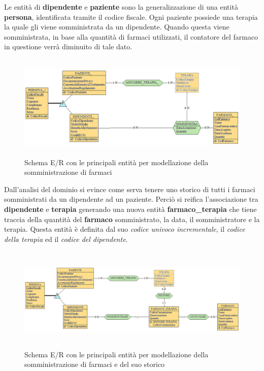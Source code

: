 \documentclass[a4paper, 12pt]{report}
\begin{document}
\noindent
Le entità di \textbf{dipendente} e \textbf{paziente} sono la generalizzazione di una entità \textbf{persona}, identificata
tramite il codice fiscale. Ogni paziente possiede una terapia la quale gli viene somministrata da un dipendente.
Quando questa viene somministrata, in base alla quantità di farmaci utilizzati, il contatore del farmaco in questione verrà
diminuito di tale dato.

\begin{figure}[H]
        \centering
        \includegraphics[height=5cm]{img/dipendentePazienteERPostReif.png}
        \caption{Schema E/R con le principali entità per modellazione della somministrazione di farmaci}
\end{figure}

\noindent
Dall'analisi del dominio si evince come serva tenere uno storico di tutti i farmaci somministrati
da un dipendente ad un paziente. Perciò si reifica l'associazione tra \textbf{dipendente} e \textbf{terapia} generando
una nuova entità \textbf{farmaco\_terapia} che tiene traccia della quantità del \textbf{farmaco} somministrato, la data, 
il somministratore e la terapia. Questa entità è definita dal suo \textit{codice univoco incrementale}, il \textit{codice della terapia} ed 
il \textit{codice del dipendente}.

\begin{figure}[H]
        \centering
        \includegraphics[height=5cm]{img/dipendentePazienteERPreReif.png}
        \caption{Schema E/R con le principali entità per modellazione della somministrazione di farmaci e del suo storico}
\end{figure}
\end{document}
